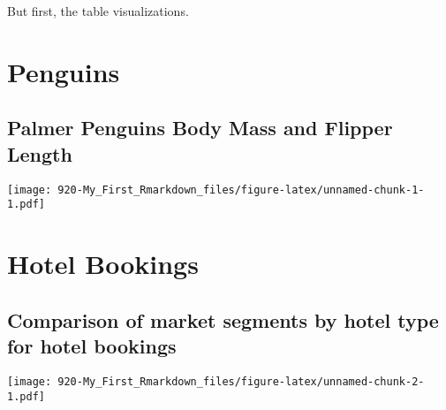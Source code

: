 \documentclass[
]{article}
\begin{document}
But first, the table visualizations.

\hypertarget{penguins}{%
\section{Penguins}\label{penguins}}

\hypertarget{palmer-penguins-body-mass-and-flipper-length}{%
\subsection{Palmer Penguins Body Mass and Flipper
Length}\label{palmer-penguins-body-mass-and-flipper-length}}

\texttt{[image: 920-My\_First\_Rmarkdown\_files/figure-latex/unnamed-chunk-1-1.pdf]}

\hypertarget{hotel-bookings}{%
\section{Hotel Bookings}\label{hotel-bookings}}

\hypertarget{comparison-of-market-segments-by-hotel-type-for-hotel-bookings}{%
\subsection{Comparison of market segments by hotel type for hotel
bookings}\label{comparison-of-market-segments-by-hotel-type-for-hotel-bookings}}

\texttt{[image: 920-My\_First\_Rmarkdown\_files/figure-latex/unnamed-chunk-2-1.pdf]}
\end{document}
